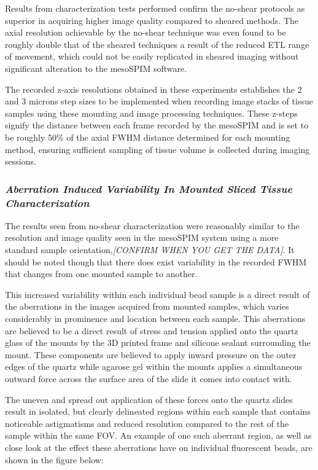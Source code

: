Results from characterization tests performed confirm the no-shear protocols as superior in acquiring higher image quality compared to sheared methods. The axial resolution achievable by the no-shear technique was even found to be roughly double that of the sheared techniques a result of the reduced ETL range of movement, which could not be easily replicated in sheared imaging without significant alteration to the mesoSPIM software.

The recorded z-axis resolutions obtained in these experiments establishes the 2 and 3 microns step sizes to be implemented when recording image stacks of tissue samples using these mounting and image processing techniques. These z-steps signify the distance between each frame recorded by the mesoSPIM and is set to be roughly 50\% of the axial FWHM distance determined for each mounting method, ensuring sufficient sampling of tissue volume is collected during imaging sessions. 


\subsubsection{\textit{Aberration Induced Variability In Mounted Sliced Tissue Characterization}}

The results seen from no-shear characterization were reasonably similar to the resolution and image quality seen in the mesoSPIM system using a more standard sample orientation,\textit{[CONFIRM WHEN YOU GET THE DATA]}. It should be noted though that there does exist variability in the recorded FWHM that changes from one mounted sample to another.

This increased variability within each individual bead sample is a direct result of the aberrations in the images acquired from mounted samples, which varies considerably in prominence and location between each sample. This aberrations are believed to be a direct result of stress and tension applied onto the quartz glass of the mounts by the 3D printed frame and silicone sealant surrounding the mount. These components are believed to apply inward pressure on the outer edges of the quartz while agarose gel within the mounts applies a simultaneous outward force across the surface area of the slide it comes into contact with.

The uneven and spread out application of these forces onto the quartz slides result in isolated, but clearly delineated regions within each sample that contains noticeable astigmatisms and reduced resolution compared to the rest of the sample within the same FOV. An example of one such aberrant region, as well as close look at the effect these aberrations have on individual fluorescent beads, are shown in the figure below:

